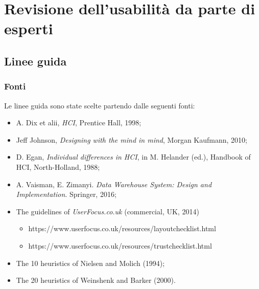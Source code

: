 \section{Revisione dell'usabilità da parte di esperti}

\subsection{Linee guida}

\subsubsection{Fonti}
Le linee guida sono state scelte partendo dalle seguenti fonti:
\begin{itemize}
    \item A. Dix et alii, \textit{HCI}, Prentice Hall, 1998;
    \item Jeff Johnson, \textit{Designing with the mind in mind}, Morgan Kaufmann, 2010;
    \item D. Egan, \textit{Individual differences in HCI}, in M. Helander (ed.), Handbook of HCI, North-Holland, 1988;
    \item A. Vaisman, E. Zimanyi. \textit{Data Warehouse System: Design and Implementation}. Springer, 2016;
    \item The guidelines of \textit{UserFocus.co.uk} (commercial, UK, 2014)
    \begin{itemize}
        \item https://www.userfocus.co.uk/resources/layoutchecklist.html
        \item https://www.userfocus.co.uk/resources/trustchecklist.html
    \end{itemize}
    \item The 10 heuristics of Nielsen and Molich (1994);
    \item The 20 heuristics of Weinshenk and Barker (2000).
\end{itemize}

